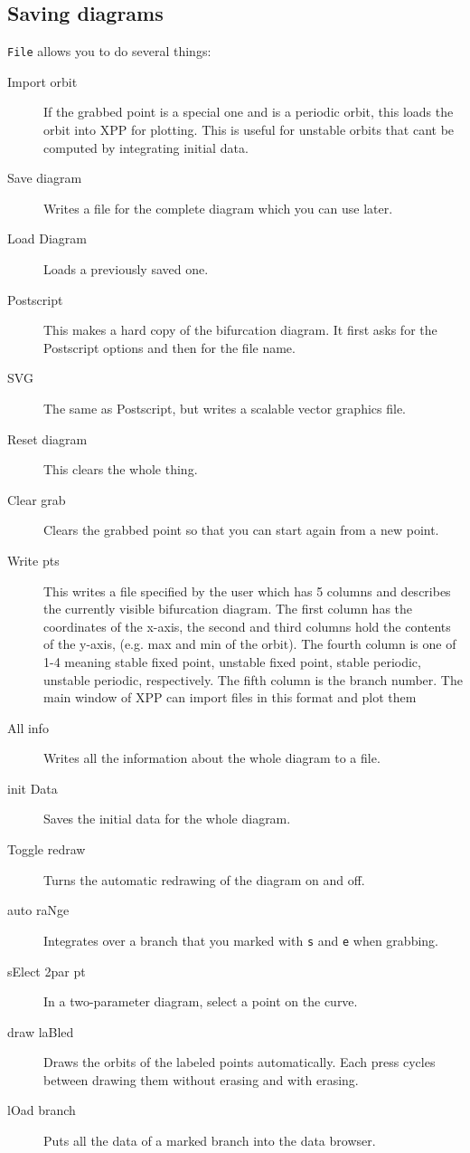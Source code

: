 \documentclass{article}
\begin{document}
\subsection{Saving diagrams}
{\tt File} allows you to do several things:
\begin{description}
\item[Import orbit] If the grabbed point is a special one and is a
periodic orbit, this loads the orbit into XPP for plotting.  This is
useful for unstable orbits that cant be computed by integrating
initial data.
\item[Save diagram] Writes a file for the complete diagram which you
can use later.
\item[Load Diagram] Loads a previously saved one.
\item[Postscript]  This makes a hard copy of the bifurcation diagram.  It
first asks for the Postscript options and then for the file name.
\item[SVG] The same as Postscript, but writes a scalable vector graphics file.
\item[Reset diagram] This clears the whole thing.
\item[Clear grab] Clears the grabbed point so that you can start again from a new point.
\item[Write pts] This writes a file specified by the user which has 5
columns and describes the currently visible bifurcation diagram. The
first column has the coordinates of the x-axis, the second and third
columns hold the contents of the y-axis, (e.g. max and min of the
orbit). The fourth column is one of 1-4 meaning stable fixed point,
unstable fixed point, stable periodic, unstable periodic,
respectively. The fifth column is the branch number.  The main window
of XPP can import files in this format and plot them
\item[All info] Writes all the information about the whole diagram to a file.
\item[init Data] Saves the initial data for the whole diagram.
\item[Toggle redraw] Turns the automatic redrawing of the diagram on and off.
\item[auto raNge] Integrates over a branch that you marked with {\tt s} and {\tt e}
when grabbing.
\item[sElect 2par pt] In a two-parameter diagram, select a point on the curve.
\item[draw laBled] Draws the orbits of the labeled points automatically.
Each press cycles between drawing them without erasing and with erasing.
\item[lOad branch] Puts all the data of a marked branch into the data browser.
\end{description}
\end{document}
